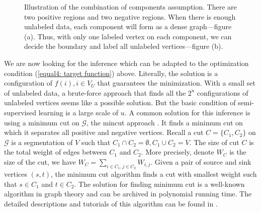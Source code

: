 \begin{figure}[!ht]
\begin{subfigure}[b]{0.4\textwidth}
		\caption{}
		\label{fig4.b: combination of components assumption}
	\end{subfigure}
	\hfill
	\caption[Illustration of the combination of components assumption.]{Illustration of the combination of components assumption. There are two positive regions and two negative regions. When there is enough unlabeled data, each component will form as a dense graph---figure (a). Thus, with only one labeled vertex on each component, we can decide the boundary and label all unlabeled vertices---figure (b).}
	\label{fig4: combination of components assumption}
\end{figure}

We are now looking for the inference which can be adapted to the optimization condition (\ref{equal4: target function}) above. Literally, the solution is a configuration of $f(i), i \in V_U$ that guarantees the minimization. With a small set of unlabeled data, a brute-force approach that finds all the $2^u$ configurations of unlabeled vertices seems like a possible solution. But the basic condition of semi-supervised learning is a large scale of $u$. A common solution for this inference is using a minimum cut on $\mathcal{G}$, the mincut approach \parencite{Blum:2001:LLU:645530.757779}. It finds a minimum cut on which it separates all positive and negative vertices. Recall a cut $C= \{C_1, C_2\}$ on $\mathcal{G}$ is a segmentation of $V$ such that $C_1 \cap C_2 = \emptyset, C_1 \cup C_2 = V$. The size of cut $C$ is the total weight of edges between $C_1$ and $C_2$. More precisely, denote $W_C$ is the size of the cut, we have $W_C = \sum_{i \in C_1, j \in C_2} W_{i,j}$. Given a pair of source and sink vertices $(s, t)$, the minimum cut algorithm finds a cut with smallest weight such that $s \in C_1$ and $t \in C_2$. The solution for finding minimum cut is a well-known algorithm in graph theory and can be archived in polynomial running time. The detailed descriptions and tutorials of this algorithm can be found in \parencite{cormen2009introduction, West2001}.

